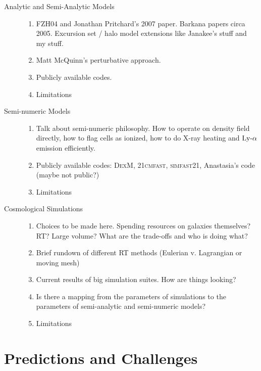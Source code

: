 \documentclass[letterpaper,titlepage,12pt]{article}
\begin{document}
\begin{description}
  \item[Analytic and Semi-Analytic Models] \hfill
  \begin{enumerate}
      \item FZH04 and Jonathan Pritchard's 2007 paper. Barkana papers circa 2005. Excursion set / halo model extensions like Janakee's stuff and my stuff.
      \item Matt McQuinn's perturbative approach.
      \item Publicly available codes.
      \item Limitations
  \end{enumerate}
  
  \item[Semi-numeric Models] \hfill
  \begin{enumerate}
      \item Talk about semi-numeric philosophy. How to operate on density field directly, how to flag cells as ionized, how to do X-ray heating and $\text{Ly-}\alpha$ emission efficiently.
      \item Publicly available codes: \textsc{DexM}, \textsc{21cmfast}, \textsc{simfast21}, Anastasia's code (maybe not public?)
      \item Limitations
  \end{enumerate}

  \item[Cosmological Simulations] \hfill
  \begin{enumerate}
      \item Choices to be made here. Spending resources on galaxies themselves? RT? Large volume? What are the trade-offs and who is doing what?
      \item Brief rundown of different RT methods (Eulerian v. Lagrangian or moving mesh)
      \item Current results of big simulation suites. How are things looking?
      \item Is there a mapping from the parameters of simulations to the parameters of semi-analytic and semi-numeric models?
	  \item Limitations
  \end{enumerate}
  
\end{description}

\section{Predictions and Challenges} \label{sec:predictions} \vspace{-12pt}
\end{document}
